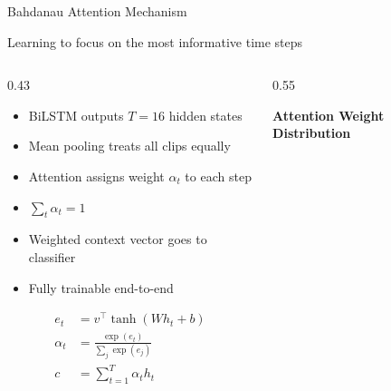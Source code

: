 \documentclass[aspectratio=169, 10pt]{beamer}
\begin{document}
\begin{frame}{Bahdanau Attention Mechanism}

\textcolor{NavyBlue}{\footnotesize
Learning to focus on the most informative time steps}

\vspace{3pt}

\small

\begin{columns}[T,onlytextwidth]

\begin{column}{0.43\textwidth}

\begin{tcolorbox}[
purplecard,
title={\small What Does Attention Solve?},
boxsep=2pt,
left=3pt,right=3pt,
top=3pt,bottom=3pt]

\footnotesize
\begin{itemize}[leftmargin=*, itemsep=1pt]
  \item BiLSTM outputs $T=16$ hidden states
  \item Mean pooling treats all clips equally
  \item Attention assigns weight $\alpha_t$ to each step
  \item $\sum_t \alpha_t = 1$
  \item Weighted context vector goes to classifier
  \item Fully trainable end-to-end
\end{itemize}

\end{tcolorbox}

\vspace{0.5pt}

\begin{tcolorbox}[
purplecard,
title={\small Bahdanau Equations},
boxsep=1pt,
left=3pt,right=3pt,
top=1pt,bottom=1pt]

\scriptsize
\begin{align*}
e_t &= v^\top \tanh(W h_t + b) \\
\alpha_t &= \frac{\exp(e_t)}{\sum_j \exp(e_j)} \\
c &= \sum_{t=1}^{T} \alpha_t h_t
\end{align*}

\end{tcolorbox}

\end{column}

\begin{column}{0.55\textwidth}

\textcolor{NavyBlue}{\small\bfseries Attention Weight Distribution}


\end{column}
\end{columns}
\end{frame}
\end{document}
